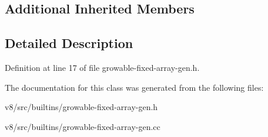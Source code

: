 \subsection*{Additional Inherited Members}


\subsection{Detailed Description}


Definition at line 17 of file growable-\/fixed-\/array-\/gen.\+h.



The documentation for this class was generated from the following files\+:\begin{DoxyCompactItemize}
\item 
v8/src/builtins/growable-\/fixed-\/array-\/gen.\+h\item 
v8/src/builtins/growable-\/fixed-\/array-\/gen.\+cc\end{DoxyCompactItemize}
